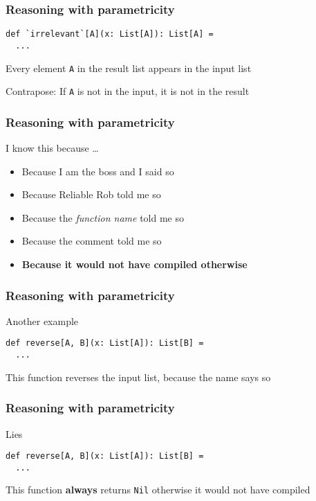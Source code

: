 \begin{frame}[fragile]
\frametitle{Reasoning with parametricity}
\begin{lstlisting}[style=scala]
def `irrelevant`[A](x: List[A]): List[A] = 
  ...
\end{lstlisting}
\begin{theorem}Every element \lstinline{A} in the result list appears in the input list\end{theorem}
\begin{theorem}Contrapose: If \lstinline{A} is not in the input, it is not in the result\end{theorem}
\end{frame}

\begin{frame}[fragile]
\frametitle{Reasoning with parametricity}
\begin{block}{I know this because \ldots}
\begin{itemize}
  \item<1> Because I am the boss and I said so
  \item<2> Because Reliable Rob told me so
  \item<3> Because the \emph{function name} told me so
  \item<4> Because the comment told me so
  \item<5> \textbf{Because it would not have compiled otherwise}
\end{itemize}
\end{block}
\end{frame}

\begin{frame}[fragile]
\frametitle{Reasoning with parametricity}
\begin{block}{Another example}
\begin{lstlisting}[style=scala]
def reverse[A, B](x: List[A]): List[B] = 
  ...
\end{lstlisting}
\end{block}
\begin{theorem}This function reverses the input list, because the name says so\end{theorem}
\end{frame}

\begin{frame}[fragile]
\frametitle{Reasoning with parametricity}
\begin{block}{Lies}
\begin{lstlisting}[style=scala]
def reverse[A, B](x: List[A]): List[B] = 
  ...
\end{lstlisting}
\end{block}
\begin{theorem}This function \textbf{always} returns \lstinline{Nil} otherwise it would not have compiled\end{theorem}
\end{frame}

